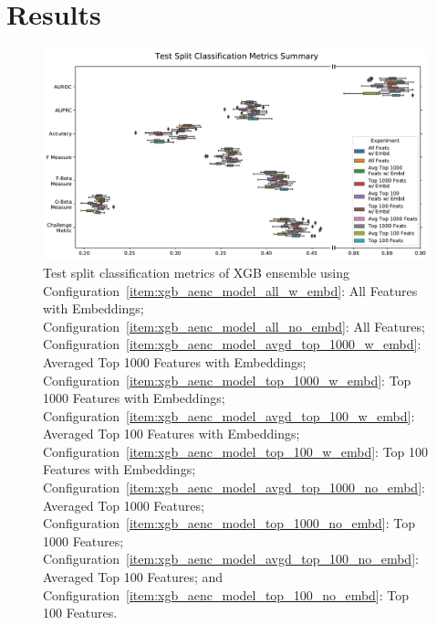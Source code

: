 \documentclass[\main/thesis.tex]{subfiles}
\begin{document}
\section{Results}
\label{sec:xgb_aenc_results}

\begin{figure}[h]
    \centering
    \includegraphics[trim={0.2cm 0.3cm 0.2cm 0.1cm},clip,width=\textwidth]{figure/xgb_aenc_classification_metrics.pdf}
    \caption[Test split classification metrics of XGB ensemble using all configurations of engineered features and autoencoder embeddings.]{Test split classification metrics of XGB ensemble using
    Configuration~\ref{item:xgb_aenc_model_all_w_embd}: All Features with Embeddings;
    Configuration~\ref{item:xgb_aenc_model_all_no_embd}: All Features;
    Configuration~\ref{item:xgb_aenc_model_avgd_top_1000_w_embd}: Averaged Top 1000 Features with Embeddings;
    Configuration~\ref{item:xgb_aenc_model_top_1000_w_embd}: Top 1000 Features with Embeddings;
    Configuration~\ref{item:xgb_aenc_model_avgd_top_100_w_embd}: Averaged Top 100 Features with Embeddings;
    Configuration~\ref{item:xgb_aenc_model_top_100_w_embd}: Top 100 Features with Embeddings;
    Configuration~\ref{item:xgb_aenc_model_avgd_top_1000_no_embd}: Averaged Top 1000 Features;
    Configuration~\ref{item:xgb_aenc_model_top_1000_no_embd}: Top 1000 Features;
    Configuration~\ref{item:xgb_aenc_model_avgd_top_100_no_embd}: Averaged Top 100 Features; and
    Configuration~\ref{item:xgb_aenc_model_top_100_no_embd}: Top 100 Features.
    }
    \label{fig:xgb_aenc_classification_metrics}
\end{figure}
\end{document}

